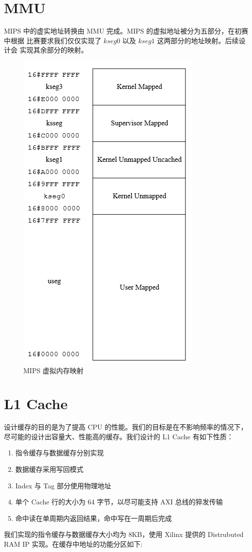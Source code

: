 \documentclass[blue,normal,cn,hide]{elegantbook}
\begin{document}
\section{MMU}
MIPS 中的虚实地址转换由 MMU 完成。MIPS 的虚拟地址被分为五部分，在初赛中根据
比赛要求我们仅仅实现了 $kseg0$ 以及 $kseg1$ 这两部分的地址映射。后续设计会
实现其余部分的映射。

\begin{figure}[htpb]
    \centering
    \includegraphics[width=.4\textwidth]{figures/VirtualAddress}
    \caption{MIPS 虚拟内存映射}
    \label{fig:VirtualAddress}
\end{figure}

\section{L1 Cache}

设计缓存的目的是为了提高 CPU 的性能。我们的目标是在不影响频率的情况下，
尽可能的设计出容量大、性能高的缓存。我们设计的 L1 Cache 有如下性质：

\begin{enumerate}
    \item 指令缓存与数据缓存分别实现
    \item 数据缓存采用写回模式
    \item Index 与 Tag 部分使用物理地址
    \item 单个 Cache 行的大小为 64 字节，以尽可能支持 AXI 总线的猝发传输
    \item 命中读在单周期内返回结果，命中写在一周期后完成
\end{enumerate}

我们实现的指令缓存与数据缓存大小均为 8KB，使用 Xilinx 提供的 Distrubuted 
RAM IP 实现。在缓存中地址的功能分区如下:
\end{document}
